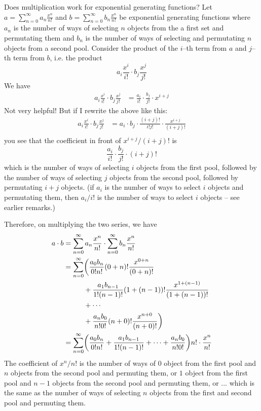 Does multiplication work for exponential generating functions?
Let 
$a = \sum_{n=0}^\infty a_n \frac{x^n}{n!}$ 
and 
$b = \sum_{n=0}^\infty b_n \frac{x^n}{n!}$ 
be exponential generating functions where
$a_n$ is the number of ways of selecting $n$ objects from the a first set
and permutating them
and 
$b_n$ is the number of ways of selecting and permutating $n$ 
objects from a second pool.
Consider the product of the $i$--th term from $a$ and $j$--th term
from $b$, i.e. the product 
\[
a_i \frac{x^i}{i!} \cdot
b_j \frac{x^j}{j!}
\]
We have
\begin{align*}
a_i \frac{x^i}{i!} \cdot b_j \frac{x^j}{j!}
&= \frac{a_i}{i!} \cdot \frac{b_j}{j!}  \cdot x^{i+j}
\end{align*}
Not very helpful!
But if I rewrite the above like this:
\begin{align*}
a_i \frac{x^i}{i!} \cdot b_j \frac{x^j}{j!}
&= a_i \cdot b_j \cdot  \frac{(i+j)!}{i! j!} 
\cdot \frac{x^{i+j}}{(i+j)!} \\
\end{align*}
you see that the coefficient in front of $x^{i+j}/(i+j)!$ is
\[
\frac{a_i}{i!} \cdot \frac{b_j}{j!} \cdot (i+j)! 
\]
which is the number of ways of selecting $i$ objects from the first pool,
followed by the number of ways of selecting $j$ objects from the 
second pool, followed by permutating $i + j$ objects.
(if $a_i$ is the number of ways to select $i$ objects
and permutating them, then $a_i/i!$ is the number of ways
to select $i$ objects -- see earlier remarks.)

Therefore, on multiplying the two series, we have
\begin{align*}
a \cdot b 
&= \sum_{n=0}^\infty a_n \frac{x^n}{n!} \cdot 
   \sum_{n=0}^\infty b_n \frac{x^n}{n!} \\
&= \sum_{n=0}^\infty
\biggl(
\frac{a_0 b_n}{0! n!} (0+n)! \frac{x^{0+n}}{(0+n)!} \\
&\hskip 1cm + \frac{a_1 b_{n-1}}{1! (n-1)!} (1+(n-1))! \frac{x^{1+(n-1)}}{(1+(n-1))!} \\
&\hskip 1cm + \cdots \\
&\hskip 1cm + \frac{a_n b_0}{n! 0!}(n+0)!\frac{x^{n+0}}{(n+0)!}
\biggr) \\
&= \sum_{n=0}^\infty
\biggl(
\frac{a_0 b_n}{0! n!} +
\frac{a_1 b_{n-1}}{1! (n-1)!} +
\cdots +
\frac{a_n b_0}{n! 0!}
\biggr) n! \cdot \frac{x^n}{n!}
\end{align*}
The coefficient of $x^n/n!$ is the number of ways of 
$0$ object from the first pool and $n$ objects from the second pool
and permuting them, or
$1$ object from the first pool and $n-1$ objects from the second pool
and permuting them, or ...
which is the same as the number of ways of 
selecting $n$ objects from the first and second pool and permuting them.

